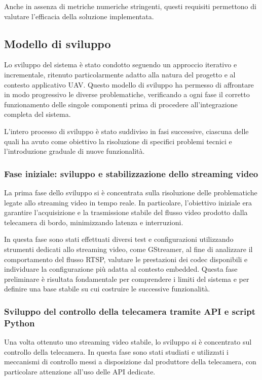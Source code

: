 Anche in assenza di metriche numeriche stringenti, questi requisiti permettono di valutare l’efficacia della soluzione implementata.



\subsection{Modello di sviluppo}


Lo sviluppo del sistema è stato condotto seguendo un approccio iterativo e incrementale, ritenuto particolarmente adatto alla natura del progetto e al contesto applicativo UAV.  
Questo modello di sviluppo ha permesso di affrontare in modo progressivo le diverse problematiche, verificando a ogni fase il corretto funzionamento delle singole componenti prima di procedere all’integrazione completa del sistema.

L’intero processo di sviluppo è stato suddiviso in fasi successive, ciascuna delle quali ha avuto come obiettivo la risoluzione di specifici problemi tecnici e l’introduzione graduale di nuove funzionalità.

\subsubsection{Fase iniziale: sviluppo e stabilizzazione dello streaming video}

La prima fase dello sviluppo si è concentrata sulla risoluzione delle problematiche legate allo streaming video in tempo reale.  
In particolare, l’obiettivo iniziale era garantire l’acquisizione e la trasmissione stabile del flusso video prodotto dalla telecamera di bordo, minimizzando latenza e interruzioni.

In questa fase sono stati effettuati diversi test e configurazioni utilizzando strumenti dedicati allo streaming video, come GStreamer, al fine di analizzare il comportamento del flusso RTSP, valutare le prestazioni dei codec disponibili e individuare la configurazione più adatta al contesto embedded.  
Questa fase preliminare è risultata fondamentale per comprendere i limiti del sistema e per definire una base stabile su cui costruire le successive funzionalità.

\subsubsection{Sviluppo del controllo della telecamera tramite API e script Python}

Una volta ottenuto uno streaming video stabile, lo sviluppo si è concentrato sul controllo della telecamera.  
In questa fase sono stati studiati e utilizzati i meccanismi di controllo messi a disposizione dal produttore della telecamera, con particolare attenzione all’uso delle API dedicate.

